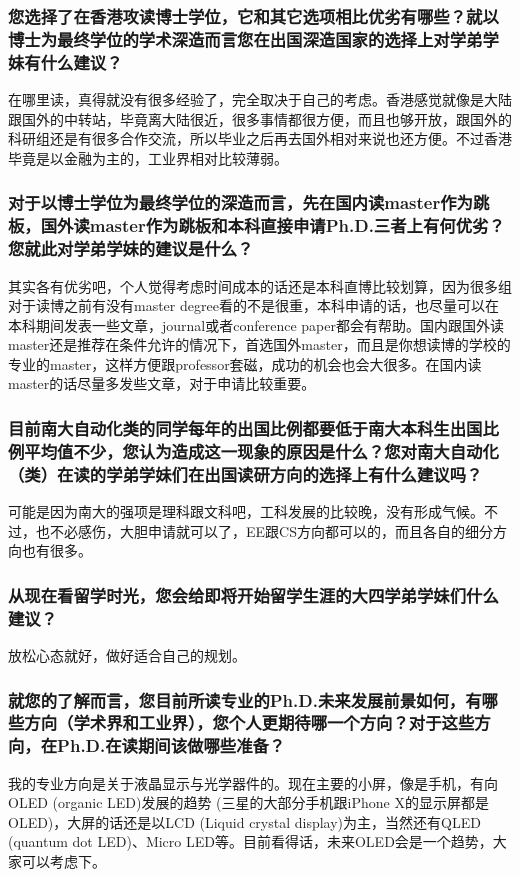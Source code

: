 \documentclass[a4paper,UTF8]{book}
\begin{document}
    \subsubsection*{您选择了在香港攻读博士学位，它和其它选项相比优劣有哪些？就以博士为最终学位的学术深造而言您在出国深造国家的选择上对学弟学妹有什么建议？}
    在哪里读，真得就没有很多经验了，完全取决于自己的考虑。香港感觉就像是大陆跟国外的中转站，毕竟离大陆很近，很多事情都很方便，而且也够开放，跟国外的科研组还是有很多合作交流，所以毕业之后再去国外相对来说也还方便。不过香港毕竟是以金融为主的，工业界相对比较薄弱。

    \subsubsection*{对于以博士学位为最终学位的深造而言，先在国内读master作为跳板，国外读master作为跳板和本科直接申请Ph.D.三者上有何优劣？您就此对学弟学妹的建议是什么？}
    其实各有优劣吧，个人觉得考虑时间成本的话还是本科直博比较划算，因为很多组对于读博之前有没有master degree看的不是很重，本科申请的话，也尽量可以在本科期间发表一些文章，journal或者conference paper都会有帮助。国内跟国外读master还是推荐在条件允许的情况下，首选国外master，而且是你想读博的学校的专业的master，这样方便跟professor套磁，成功的机会也会大很多。在国内读master的话尽量多发些文章，对于申请比较重要。

    \subsubsection*{目前南大自动化类的同学每年的出国比例都要低于南大本科生出国比例平均值不少，您认为造成这一现象的原因是什么？您对南大自动化（类）在读的学弟学妹们在出国读研方向的选择上有什么建议吗？}
    可能是因为南大的强项是理科跟文科吧，工科发展的比较晚，没有形成气候。不过，也不必感伤，大胆申请就可以了，EE跟CS方向都可以的，而且各自的细分方向也有很多。

    \subsubsection*{从现在看留学时光，您会给即将开始留学生涯的大四学弟学妹们什么建议？}
    放松心态就好，做好适合自己的规划。

    \subsubsection*{就您的了解而言，您目前所读专业的Ph.D.未来发展前景如何，有哪些方向（学术界和工业界），您个人更期待哪一个方向？对于这些方向，在Ph.D.在读期间该做哪些准备？}
    我的专业方向是关于液晶显示与光学器件的。现在主要的小屏，像是手机，有向OLED (organic LED)发展的趋势 (三星的大部分手机跟iPhone X的显示屏都是OLED)，大屏的话还是以LCD (Liquid crystal display)为主，当然还有QLED (quantum dot LED)、Micro LED等。目前看得话，未来OLED会是一个趋势，大家可以考虑下。
\end{document}
